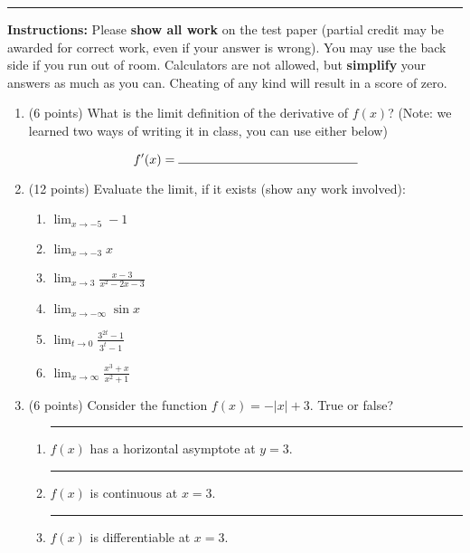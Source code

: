 \documentclass[11pt]{article}
\begin{document}
\Large



\medskip\hrule
\vspace{10pt}

\noindent \textbf{Instructions:} Please \textbf{show all work} on the test paper (partial credit may be awarded for correct work, even if your answer is wrong). You may use the back side if you run out of room. Calculators are not allowed, but \textbf{simplify} your answers as much as you can. Cheating of any kind will result in a score of zero.


\begin{enumerate}[itemsep=30pt]

\item (6 points) What is the limit definition of the derivative of $f(x)$? (Note: we learned two ways of writing it in class, you can use either below)

$$f'(x) = \rule{5cm}{0.15mm}$$

\item (12 points) Evaluate the limit, if it exists (show any work involved):
\begin{multicols}{2}
\begin{enumerate}[itemsep=50pt]
    \item $\displaystyle{\lim_{x \to -5} -1}$ \\
    \item $\displaystyle{\lim_{x \to -3} x}$ \\
    \item $\displaystyle{\lim_{x \to 3} \frac{x - 3}{x^2 - 2x - 3}}$ \\
    \item $\displaystyle{\lim_{x \to -\infty} \sin{x}}$ \\
    \item $\displaystyle{\lim_{t \to 0} \frac{3^{2t} - 1}{3^t - 1}}$ \\
    \item $\displaystyle{\lim_{x \to \infty} \frac{x^3 +x}{x^2 + 1}}$ \\
\end{enumerate}
\end{multicols}

\vspace{50pt}

\item (6 points) Consider the function $f(x) = -|x| + 3$. True or false?
\begin{enumerate}
    \item \rule{1cm}{0.4pt} $f(x)$ has a horizontal asymptote at $y=3$.
    \item \rule{1cm}{0.4pt} $f(x)$ is continuous at $x=3$.
    \item \rule{1cm}{0.4pt} $f(x)$ is differentiable at $x=3$.
\end{enumerate}


\end{enumerate}
\end{document}
